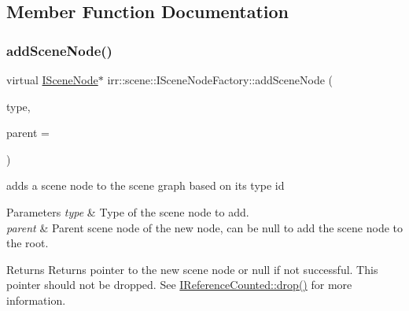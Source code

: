\subsection{Member Function Documentation}
\mbox{\label{classirr_1_1scene_1_1ISceneNodeFactory_a540de57f9f72a70ee622c536859f5997}} 
\subsubsection{\texorpdfstring{add\+Scene\+Node()}{addSceneNode()}\hspace{0.1cm}{\footnotesize\ttfamily [1/2]}}
{\footnotesize\ttfamily virtual \hyperlink{classirr_1_1scene_1_1ISceneNode}{I\+Scene\+Node}$\ast$ irr\+::scene\+::\+I\+Scene\+Node\+Factory\+::add\+Scene\+Node (\begin{DoxyParamCaption}\item[{\hyperlink{namespaceirr_1_1scene_acad3d7ef92a9807d391ba29120f3b7bd}{E\+S\+C\+E\+N\+E\+\_\+\+N\+O\+D\+E\+\_\+\+T\+Y\+PE}}]{type,  }\item[{\hyperlink{classirr_1_1scene_1_1ISceneNode}{I\+Scene\+Node} $\ast$}]{parent = {} }\end{DoxyParamCaption})\hspace{0.3cm}{\ttfamily [pure virtual]}}



adds a scene node to the scene graph based on its type id 


\begin{DoxyParams}{Parameters}
{\em type} & Type of the scene node to add. \\
\hline
{\em parent} & Parent scene node of the new node, can be null to add the scene node to the root. \\
\hline
\end{DoxyParams}
\begin{DoxyReturn}{Returns}
Returns pointer to the new scene node or null if not successful. This pointer should not be dropped. See \hyperlink{classirr_1_1IReferenceCounted_a03856a09355b89d178090c4a5f738543}{I\+Reference\+Counted\+::drop()} for more information. 
\end{DoxyReturn}
\mbox{\label{classirr_1_1scene_1_1ISceneNodeFactory_a7964a7a29260d7f0d4d052b85df78ffb}} 
